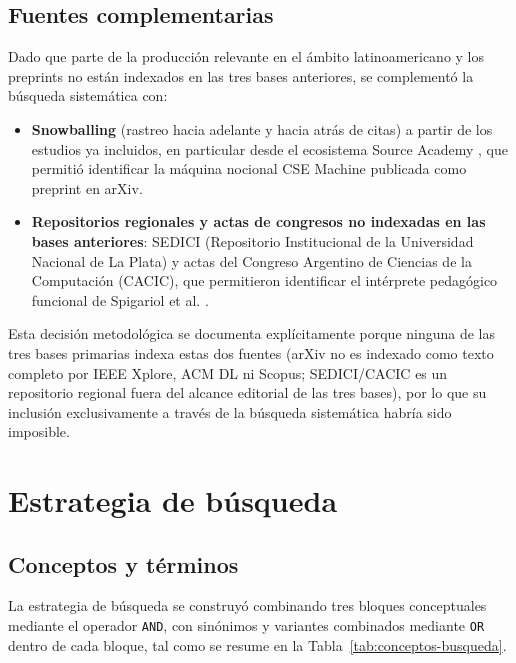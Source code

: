 \subsection{Fuentes complementarias}

Dado que parte de la producción relevante en el ámbito latinoamericano y los preprints no están indexados en las tres bases anteriores, se complementó la búsqueda sistemática con:

\begin{itemize}
    \item \textbf{Snowballing} (rastreo hacia adelante y hacia atrás de citas) a partir de los estudios ya incluidos, en particular desde el ecosistema Source Academy \cite{Cai2023VisualizingEnvironments}, que permitió identificar la máquina nocional CSE Machine \cite{Abad2024BeyondSICP} publicada como preprint en arXiv.
    \item \textbf{Repositorios regionales y actas de congresos no indexadas en las bases anteriores}: SEDICI (Repositorio Institucional de la Universidad Nacional de La Plata) y actas del Congreso Argentino de Ciencias de la Computación (CACIC), que permitieron identificar el intérprete pedagógico funcional de Spigariol et al. \cite{Spigariol2023Aprendiendo}.
\end{itemize}

Esta decisión metodológica se documenta explícitamente porque ninguna de las tres bases primarias indexa estas dos fuentes (arXiv no es indexado como texto completo por IEEE Xplore, ACM DL ni Scopus; SEDICI/CACIC es un repositorio regional fuera del alcance editorial de las tres bases), por lo que su inclusión exclusivamente a través de la búsqueda sistemática habría sido imposible.

\section{Estrategia de búsqueda}
\label{sec:cadenas-busqueda}

\subsection{Conceptos y términos}

La estrategia de búsqueda se construyó combinando tres bloques conceptuales mediante el operador \texttt{AND}, con sinónimos y variantes combinados mediante \texttt{OR} dentro de cada bloque, tal como se resume en la Tabla~\ref{tab:conceptos-busqueda}.

